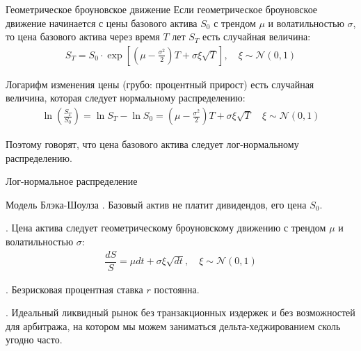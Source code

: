 \documentclass{beamer}
\begin{document}
\begin{frame}{Геометрическое броуновское движение}
\justify
Если геометрическое броуновское движение начинается с цены базового актива $S_0$ с трендом $\mu$ и волатильностью $\sigma$, то цена базового актива через время $T$ лет $S_T$ есть случайная величина:
\begin{align*}
S_T = S_0\cdot \exp\left[\left(\mu - \frac{\sigma^2}{2}\right)T + \sigma\xi\sqrt{T}\right], \quad \xi \sim \mathcal{N}(0, 1)
\end{align*} 

\justify
Логарифм изменения цены (грубо: процентный прирост) есть случайная величина, которая следует нормальному распределению:
\begin{align*}
\ln\left(\frac{S_T}{S_0}\right) = \ln S_T - \ln S_0 = \left(\mu - \frac{\sigma^2}{2}\right)T + \sigma\xi\sqrt{T} \quad \xi \sim \mathcal{N}(0, 1)
\end{align*}

\justify
Поэтому говорят, что цена базового актива следует лог-нормальному распределению.
\end{frame}



\begin{frame}{Лог-нормальное распределение}
\centering
{}
\end{frame}



\begin{frame}{Модель Блэка-Шоулза}
. Базовый актив не платит дивидендов, его цена $S_0$.

. Цена актива следует геометрическому броуновскому движению с трендом $\mu$ и волатильностью $\sigma$:
\begin{align*}
\dfrac{dS}{S} = \mu dt + \sigma\xi\sqrt{dt}, \quad \xi \sim \mathcal{N}(0,1)
\end{align*}

. Безрисковая процентная ставка $r$ постоянна.

. Идеальный ликвидный рынок без транзакционных издержек и без возможностей для арбитража, на котором мы можем заниматься дельта-хеджированием сколь угодно часто.
\end{frame}
\end{document}

